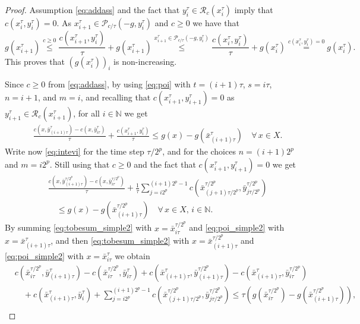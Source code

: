 \documentclass[reqno]{amsart}
\theoremstyle{plain}
\theoremstyle{remark}
\theoremstyle{plain}
\numberwithin{equation}{section}
\theoremstyle{remark}
\newcommand{\N}{\mathbb{N}}
\begin{document}
\begin{proof}
Assumption \eqref{eq:addass} and the fact that $ y^\tau_i \in \mathcal{R}_c(x_i^\tau)$ imply that $c(x_i^\tau,y_i^\tau)=0$.
 As $x^\tau_{i+1} \in \mathcal{P}_{c/\tau}(-g,y_i^\tau)$ and $c\geq 0$ we have that 
 $$g (x_{i+1}^\tau) \stackrel{c\geq0}{\leq} \frac{c(x_{i+1}^\tau,y^\tau_i) }{\tau}+ g (x_{i+1}^\tau) \stackrel{x^\tau_{i+1} \in \mathcal{P}_{c/\tau}(-g,y_i^\tau)}{\leq} \frac{c(x_{i}^\tau,y^\tau_i)}{\tau} + g (x_{i}^\tau) \stackrel{c(x_i^\tau,y_i^\tau)=0}{=} g(x_i^\tau). $$
 This proves that $(g(x_i^\tau))_i$ is non-increasing. 
 
 Since $c \ge 0$  from \eqref{eq:addass}, by using \eqref{eq:poi} with $t=(i+1)\tau$, $s=i\tau$, $n=i+1$, and $m=i$, and recalling that $c(x^\tau_{i+1},y^\tau_{i+1})=0$ as $y^\tau_{i+1}\in {\mathcal R}_c(x^\tau_{i+1})$,  for all $i\in \N$  we get 
\begin{align}\label{eq:tobesum_simple2}
&\frac{c(x,\bar{y}_{(i+1)\tau}^\tau)- c(x,\bar{y}_{i\tau}^\tau)}{\tau} + \frac{c(x_{i+1}^\tau, y_i^\tau)}{\tau}  \le g(x)-g(\bar{x}_{(i+1)\tau}^\tau) \quad \forall \, x \in X.
\end{align}
 Write now \eqref{eq:intevi} for the time   step $\tau/2^p$,  and for the choices  $n=(i+1)2^p$ and $m=i2^p$.  Still   using that $c \ge 0$  and the fact that $c(x^\tau_{i+1},y^\tau_{i+1})=0$  we get  
\begin{align}
    &\frac{c( x ,\bar{y}_{(i+1)\tau}^{\tau/2^p})-c( x ,\bar{y}_{i\tau}^{\tau/2^p})}{\tau}+\frac{1}{\tau} \sum_{j=i2^p}^{(i+1)2^p-1}c(\bar{x}_{(j+1)\tau/2^p}^{\tau/2^p}, \bar{y}_{j\tau/2^p}^{\tau/2^p}) \nonumber\\
    &\quad \le g( x ) -g(\bar{x}_{(i+1)\tau}^{\tau/2^p}) \quad \forall \, x   \in X, \, i \in \N.\label{eq:poi_simple2}
\end{align}
 By summing   \eqref{eq:tobesum_simple2} with $x=\bar{x}_{i\tau}^{\tau/2^p}$ and \eqref{eq:poi_simple2} with $x =\bar{x}_{(i+1)\tau}^\tau$,  and then  \eqref{eq:tobesum_simple2} with $x=\bar{x}_{(i+1)\tau}^{\tau/2^p}$ and \eqref{eq:poi_simple2} with $ x= \bar{x}_{i\tau}^\tau$  we   obtain
\begin{align*}
    &c(\bar{x}_{i\tau}^{\tau/2^p},\bar{y}_{(i+1)\tau}^\tau)- c(\bar{x}_{i\tau}^{\tau/2^p},\bar{y}_{i\tau}^\tau) + c(\bar{x}_{(i+1)\tau}^\tau,\bar{y}_{(i+1)\tau}^{\tau/2^p})-c(\bar{x}_{(i+1)\tau}^\tau,\bar{y}_{i\tau}^{\tau/2^p})\\
    &\quad +c(\bar{x}_{(i+1)\tau}^\tau, \bar{y}_i^\tau)+\sum_{j=i2^p}^{(i+1)2^p-1}c(\bar{x}_{(j+1)\tau/2^p}^{\tau/2^p}, \bar{y}_{j\tau/2^p}^{\tau/2^p})\le \tau(g(\bar{x}_{i\tau}^{\tau/2^p})-g(\bar{x}_{(i+1)\tau}^{\tau/2^p})), \\[1mm]

\end{align*}
\end{proof}
\end{document}
